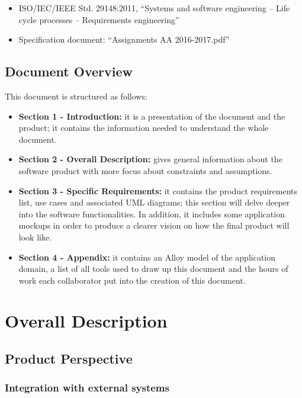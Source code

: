 \documentclass[english]{article}
\begin{document}
\begin{itemize}
	\item{ISO/IEC/IEEE Std. 29148:2011, “Systems and software engineering -- Life cycle processes -- Requirements engineering”}
	\item{Specification document: “Assignments AA 2016-2017.pdf”}
\end{itemize}

\newpage{}

\subsection{Document Overview}
This document is structured as follows:
\begin{itemize}
\item{\textbf{Section 1 - Introduction:} it is a presentation of the document and the product; it contains the information needed to understand the whole document.}
\item{\textbf{Section 2 - Overall Description:} gives general information about the software product with more focus about constraints and assumptions.}
\item{\textbf{Section 3 - Specific Requirements:} it contains the product requirements list, use cases and associated UML diagrams; this section will delve deeper into the software functionalities. In addition, it includes some application mockups in order to produce a clearer vision on how the final product will look like.}
\item{\textbf{Section 4 - Appendix:} it contains an Alloy model of the application domain, a list of all tools used to draw up this document and the hours of work each collaborator put into the creation of this document.}
\end{itemize}

\newpage{}

\section{Overall Description}

\subsection{Product Perspective}

\subsubsection{Integration with external systems}
\end{document}

